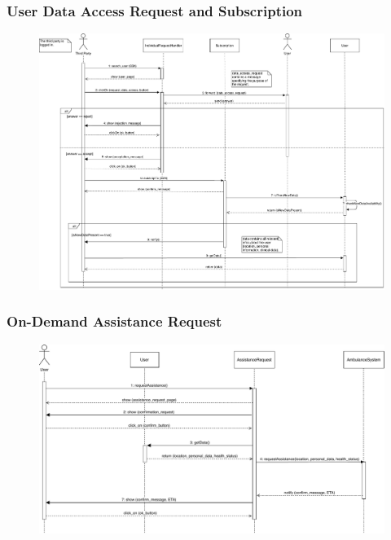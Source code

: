 \documentclass[12pt,a4paper]{article}
\begin{document}
		\subsubsection{User Data Access Request and Subscription}
		\begin{figure}[H]
			\centering
			\includegraphics[width=1.2\linewidth]{Images/request_subscription_sequence}
			\label{fig:request_subscription_sequence}
		\end{figure}
		\subsubsection{On-Demand Assistance Request}
		\begin{figure}[H]
			\centering
			\includegraphics[width=1.2\linewidth]{Images/ass_request_sequence}
			\label{fig:ass_request_sequence}
		\end{figure}
\end{document}
